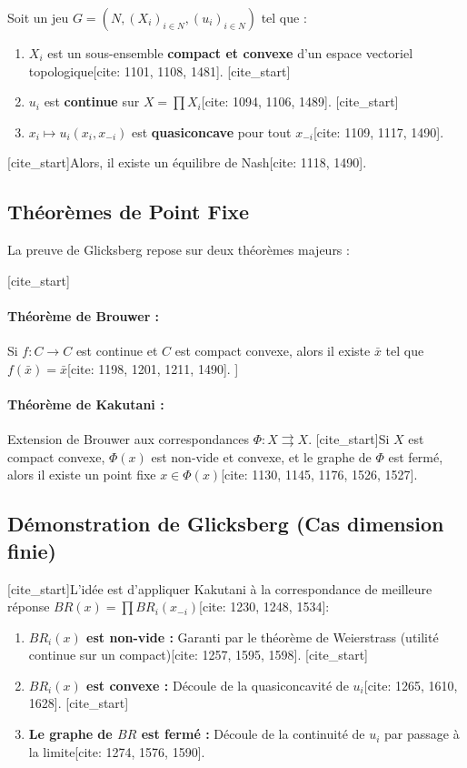 \begin{theorem}[Glicksberg]
Soit un jeu $G = (N, (X_i)_{i \in N}, (u_i)_{i \in N})$ tel que :
\begin{enumerate}
    \item $X_i$ est un sous-ensemble \textbf{compact et convexe} d'un espace vectoriel topologique[cite: 1101, 1108, 1481].
    [cite_start]\item $u_i$ est \textbf{continue} sur $X = \prod X_i$[cite: 1094, 1106, 1489].
    [cite_start]\item $x_i \mapsto u_i(x_i, x_{-i})$ est \textbf{quasiconcave} pour tout $x_{-i}$[cite: 1109, 1117, 1490].
\end{enumerate}
[cite_start]Alors, il existe un équilibre de Nash[cite: 1118, 1490].
\end{theorem}

\subsection{Théorèmes de Point Fixe}
La preuve de Glicksberg repose sur deux théorèmes majeurs :

[cite_start]\paragraph{Théorème de Brouwer :} Si $f: C \rightarrow C$ est continue et $C$ est compact convexe, alors il existe $\bar{x}$ tel que $f(\bar{x}) = \bar{x}$[cite: 1198, 1201, 1211, 1490].
]

\paragraph{Théorème de Kakutani :} Extension de Brouwer aux correspondances $\Phi: X \rightrightarrows X$. [cite_start]Si $X$ est compact convexe, $\Phi(x)$ est non-vide et convexe, et le graphe de $\Phi$ est fermé, alors il existe un point fixe $x \in \Phi(x)$[cite: 1130, 1145, 1176, 1526, 1527].

\subsection{Démonstration de Glicksberg (Cas dimension finie)}
[cite_start]L'idée est d'appliquer Kakutani à la correspondance de meilleure réponse $BR(x) = \prod BR_i(x_{-i})$[cite: 1230, 1248, 1534]:
\begin{enumerate}
    \item \textbf{$BR_i(x)$ est non-vide :} Garanti par le théorème de Weierstrass (utilité continue sur un compact)[cite: 1257, 1595, 1598].
    [cite_start]\item \textbf{$BR_i(x)$ est convexe :} Découle de la quasiconcavité de $u_i$[cite: 1265, 1610, 1628].
    [cite_start]\item \textbf{Le graphe de $BR$ est fermé :} Découle de la continuité de $u_i$ par passage à la limite[cite: 1274, 1576, 1590].
\end{enumerate}


